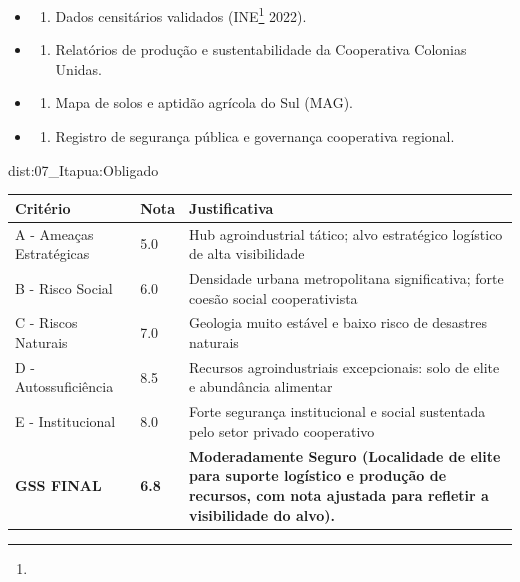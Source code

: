 {\begin{itemize}
\tightlist
\item
  \begin{enumerate}
  \def\labelenumi{\arabic{enumi})}
  \tightlist
  \item
    Dados censitários validados (INE\footnote{\fineINE} 2022).
  \end{enumerate}
\item
  \begin{enumerate}
  \def\labelenumi{\arabic{enumi})}
  \setcounter{enumi}{1}
  \tightlist
  \item
    Relatórios de produção e sustentabilidade da Cooperativa Colonias
    Unidas.
  \end{enumerate}
\item
  \begin{enumerate}
  \def\labelenumi{\arabic{enumi})}
  \setcounter{enumi}{2}
  \tightlist
  \item
    Mapa de solos e aptidão agrícola do Sul (MAG).
  \end{enumerate}
\item
  \begin{enumerate}
  \def\labelenumi{\arabic{enumi})}
  \setcounter{enumi}{3}
  \tightlist
  \item
    Registro de segurança pública e governança cooperativa regional.
  \end{enumerate}
\end{itemize}}{dist:07_Itapua:Obligado}
\begin{table}[ht!]
\small \begin{tabular}{p{3.0cm}p{0.8cm}p{6.0cm}} \toprule
\textbf{Critério} & \textbf{Nota} & \textbf{Justificativa} \\ \midrule
A - Ameaças Estratégicas & 5.0 & Hub agroindustrial tático; alvo estratégico logístico de alta visibilidade \\
B - Risco Social & 6.0 & Densidade urbana metropolitana significativa; forte coesão social cooperativista \\
C - Riscos Naturais & 7.0 & Geologia muito estável e baixo risco de desastres naturais \\
D - Autossuficiência & 8.5 & Recursos agroindustriais excepcionais: solo de elite e abundância alimentar \\
E - Institucional & 8.0 & Forte segurança institucional e social sustentada pelo setor privado cooperativo \\
\midrule \textbf{GSS FINAL} & \textbf{6.8} & \textbf{Moderadamente Seguro (Localidade de elite para suporte logístico e produção de recursos, com nota ajustada para refletir a visibilidade do alvo).} \\ \bottomrule \end{tabular}
\end{table}
